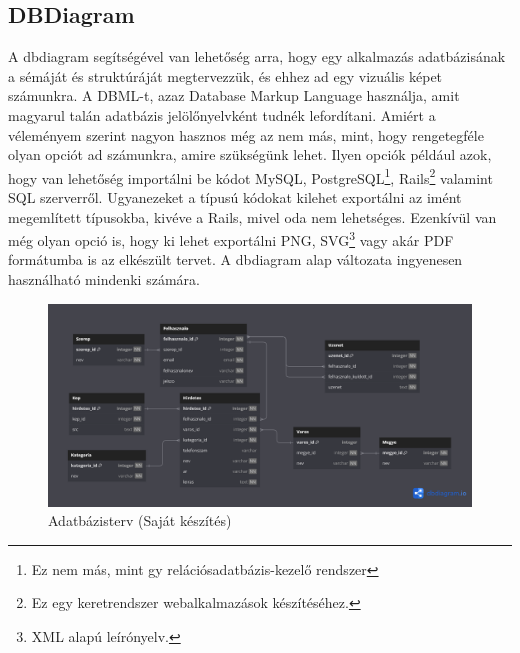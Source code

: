 \documentclass[]{thesis-ekf}
\theoremstyle{definition}
\theoremstyle{remark}
\begin{document}
	\subsection{DBDiagram}
	A dbdiagram segítségével van lehetőség arra, hogy egy alkalmazás adatbázisának a sémáját és struktúráját megtervezzük, és ehhez ad egy vizuális képet számunkra. A DBML-t, azaz Database Markup Language használja, amit magyarul talán adatbázis jelölőnyelvként tudnék lefordítani. Amiért a véleményem szerint nagyon hasznos még az nem más, mint, hogy rengetegféle olyan opciót ad számunkra, amire szükségünk lehet. Ilyen opciók például azok, hogy van lehetőség importálni be kódot MySQL, PostgreSQL\footnote{Ez nem más, mint gy relációsadatbázis-kezelő rendszer}, Rails\footnote{Ez egy keretrendszer webalkalmazások készítéséhez.} valamint SQL szerverről. Ugyanezeket a típusú kódokat kilehet exportálni az imént megemlített típusokba, kivéve a Rails, mivel oda nem lehetséges. Ezenkívül van még olyan opció is, hogy ki lehet exportálni PNG, SVG\footnote{XML alapú leírónyelv.} vagy akár PDF formátumba is az elkészült tervet. A dbdiagram alap változata ingyenesen használható mindenki számára. \cite{Dbdiagram}
	
	\begin{figure}[ht!]
		\centering
		\includegraphics[width=15cm]{./tervezes/dbdiagram}
		\caption{Adatbázisterv (Saját készítés)} 
		\label{dbdiagram}
	\end{figure}
	
\end{document}
